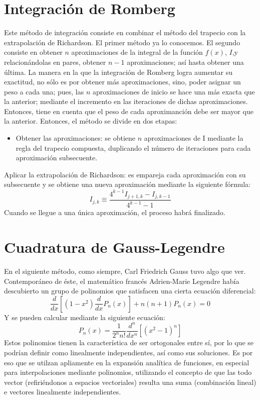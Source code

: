 \documentclass[12pt,oneside,FLEQN]{report}
\begin{document}
{\section{Integración de Romberg}
Este método de integración consiste en combinar el método del trapecio con la extrapolación de Richardson. El primer método ya lo conocemos. El segundo consiste en  obtener $n$ aproximaciones de la integral de la función $f(x)$, $I$,y relacionándolas en pares, obtener $n-1$ aproximaciones; así hasta obtener una última. La manera en la que la integración de Romberg logra aumentar su exactitud, no sólo es por obtener más aproximaciones, sino, poder asignar un peso a cada una; pues, las $n$ aproximaciones de inicio se hace una más exacta que la anterior; mediante el incremento en las iteraciones de dichas aproximaciones. Entonces, tiene en cuenta que el peso de cada aproximanción debe ser mayor que la anterior.  Entonces, el método se divide en dos etapas:
	\begin{itemize}
		\item Obtener las aproximaciones: se obtiene $n$ aproximaciones de I mediante la regla del trapecio compuesta, duplicando el número de iteraciones para cada aproximación subsecuente. 
	\end{itemize} Aplicar la extrapolación de Richardson: es empareja cada aproximación con su subsecuente y se obtiene una nueva aproximación mediante la siguiente fórmula:
	\begin{equation}
		I_{j,k}\equiv \dfrac{4^{k-1}I_{j+1,k}-I_{j,k-1}}{4^{k-1}-1}
	\end{equation}
	Cuando se llegue a una única aproximación, el proceso habrá finalizado.
\section{Cuadratura de Gauss-Legendre}
En el siguiente método, como siempre, Carl Friedrich Gauss tuvo algo que ver. Contemporáneo de éste, el matemático francés Adrien-Marie Legendre había descubierto un grupo de polinomios que satisfacen una cierta ecuación diferencial:
\begin{equation}
	\dfrac{d}{dx}\left[(1-x^{2})\dfrac{d}{dx}P_{n}(x)\right]+n(n+1)P_{n}(x)=0
\end{equation}
Y se pueden calcular mediante la siguiente ecuación:
\begin{equation}
	P_{n}(x)=\dfrac{1}{2^{n}n!}\dfrac{d^{n}}{dx^{n}}\left[(x^{2}-1)^{n}\right]
\end{equation}
Estos polinomios tienen la característica de ser ortogonales entre sí, por lo que se podrían definir como linealmente independientes, así como sus soluciones. Es por eso que se utilzan apliamente en la expansión analítica de funciones, en especial para interpolaciones mediante polinomios, utilizando el concepto de que las todo vector (refiriéndonos a espacios vectoriales) resulta una suma (combinación lineal) e vectores linealmente independientes.\\

}
\end{document}
